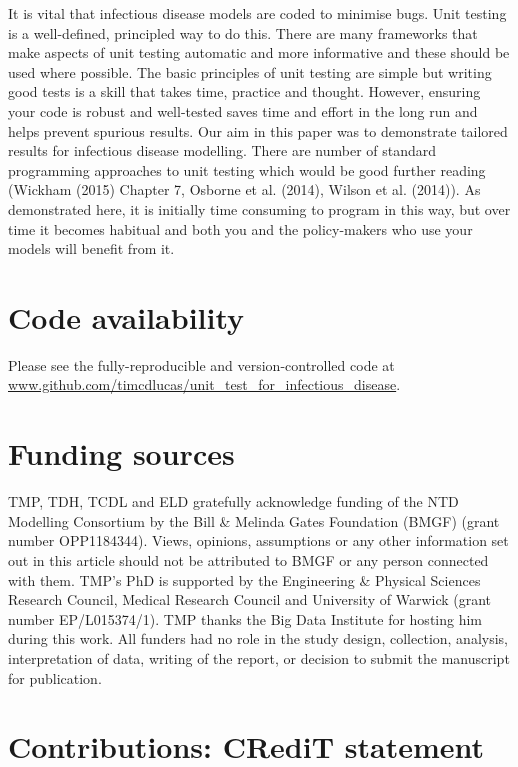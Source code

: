 \documentclass[
]{article}
\begin{document}
It is vital that infectious disease models are coded to minimise bugs.
Unit testing is a well-defined, principled way to do this.
There are many frameworks that make aspects of unit testing automatic and more informative and these should be used where possible.
\newline
\newline
The basic principles of unit testing are simple but writing good tests is a skill that takes time, practice and thought.
However, ensuring your code is robust and well-tested saves time and effort in the long run and helps prevent spurious results.
Our aim in this paper was to demonstrate tailored results for infectious disease modelling.
There are number of standard programming approaches to unit testing which would be good further reading (Wickham (2015) Chapter 7, Osborne et al. (2014), Wilson et al. (2014)).
As demonstrated here, it is initially time consuming to program in this way, but over time it becomes habitual and both you and the policy-makers who use your models will benefit from it.

\hypertarget{code-availability}{%
\section{Code availability}\label{code-availability}}

Please see the fully-reproducible and version-controlled code at \url{www.github.com/timcdlucas/unit_test_for_infectious_disease}.

\hypertarget{funding-sources}{%
\section{Funding sources}\label{funding-sources}}

TMP, TDH, TCDL and ELD gratefully acknowledge funding of the NTD Modelling Consortium by the Bill \& Melinda Gates Foundation (BMGF) (grant number OPP1184344).
Views, opinions, assumptions or any other information set out in this article should not be
attributed to BMGF or any person connected with them.
TMP's PhD is supported by the Engineering \& Physical Sciences Research Council, Medical
Research Council and University of Warwick (grant number EP/L015374/1).
TMP thanks the Big Data Institute for hosting him during this work.
All funders had no role in the study design, collection, analysis, interpretation of data,
writing of the report, or decision to submit the manuscript for publication.

\hypertarget{contributions-credit-statement}{%
\section{Contributions: CRediT statement}\label{contributions-credit-statement}}
\end{document}
